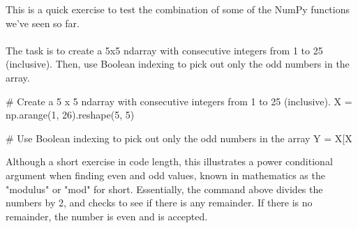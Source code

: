 This is a quick exercise to test the combination of some of the NumPy functions we've seen so far.
\\\\
The task is to create a 5x5 ndarray with consecutive integers from 1 to 25 (inclusive). Then, use Boolean indexing to pick out only the odd numbers in the array.

\begin{python}
	# Create a 5 x 5 ndarray with consecutive integers from 1 to 25 (inclusive).
	X = np.arange(1, 26).reshape(5, 5)
	
	# Use Boolean indexing to pick out only the odd numbers in the array
	Y = X[X %
\end{python}

Although a short exercise in code length, this illustrates a power conditional argument when finding even and odd values, known in mathematics as the "modulus" or "mod" for short. Essentially, the command above divides the numbers by 2, and checks to see if there is any remainder. If there is no remainder, the number is even and is accepted.